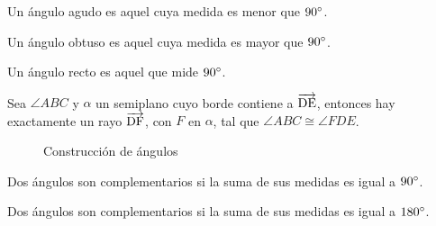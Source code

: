\begin{definition}
    Un ángulo agudo es aquel cuya medida es menor que $90^{\circ}$.
\end{definition}

\begin{definition}
    Un ángulo obtuso es aquel cuya medida es mayor que $90^{\circ}$.
\end{definition}

\begin{definition}
    Un ángulo recto es aquel que mide $90^{\circ}$.
\end{definition}

\clearpage

\begin{theorem}
    Sea $\angle{ABC}$ y $\alpha$ un semiplano cuyo borde contiene a $\overrightarrow{\rm DE}$, entonces hay exactamente un rayo $\overrightarrow{\rm DF}$, con $F$ en $\alpha$, tal que $\angle{ABC} \cong \angle{FDE}$.

    \begin{figure}[h!]
    
        \centering
    
        \begin{subfigure}[b]{.3\textwidth}
            \centering
            
            \label{fig:plot108}
        \end{subfigure}%
        \begin{subfigure}[b]{.3\textwidth}
            \centering
            
            \label{fig:plot109}
        \end{subfigure}

        \caption{Construcción de ángulos}
        \label{fig:ang-const-teorema}
        
    \end{figure}        
    
\end{theorem}

\begin{definition}
    Dos ángulos son complementarios si la suma de sus medidas es igual a $90^{\circ}$.
\end{definition}

\begin{definition}
    Dos ángulos son complementarios si la suma de sus medidas es igual a $180^{\circ}$.
\end{definition}

